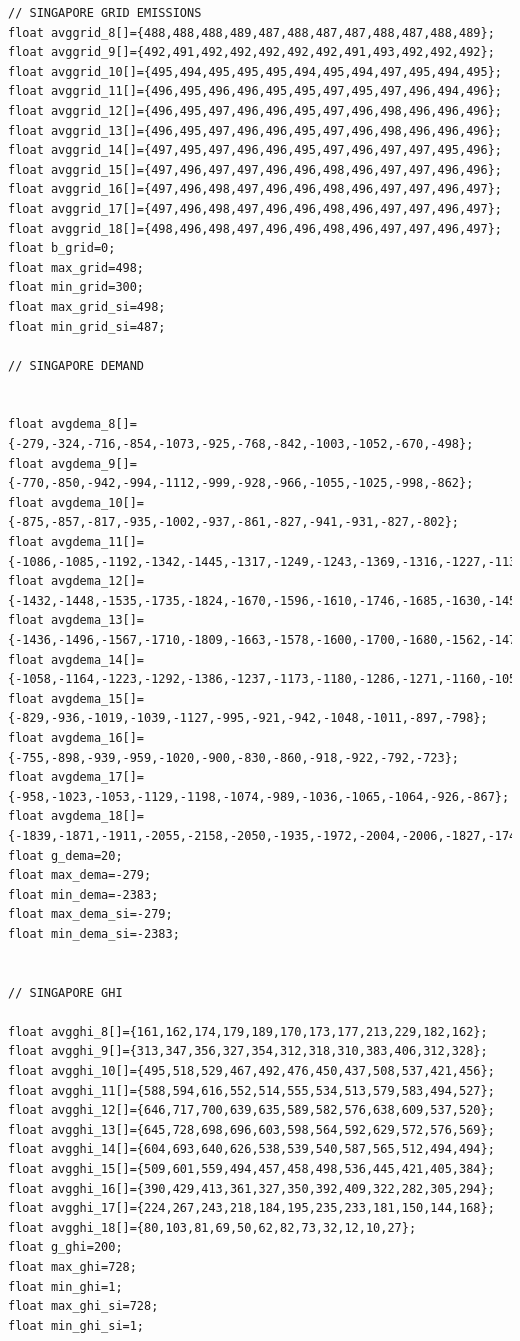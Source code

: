 \documentclass[a4paper,9pt]{article}
\begin{document}
\begin{lstlisting}[basicstyle=\tiny,style=CStyle]
// SINGAPORE GRID EMISSIONS
float avggrid_8[]={488,488,488,489,487,488,487,487,488,487,488,489};
float avggrid_9[]={492,491,492,492,492,492,492,491,493,492,492,492};
float avggrid_10[]={495,494,495,495,495,494,495,494,497,495,494,495};
float avggrid_11[]={496,495,496,496,495,495,497,495,497,496,494,496};
float avggrid_12[]={496,495,497,496,496,495,497,496,498,496,496,496};
float avggrid_13[]={496,495,497,496,496,495,497,496,498,496,496,496};
float avggrid_14[]={497,495,497,496,496,495,497,496,497,497,495,496};
float avggrid_15[]={497,496,497,497,496,496,498,496,497,497,496,496};
float avggrid_16[]={497,496,498,497,496,496,498,496,497,497,496,497};
float avggrid_17[]={497,496,498,497,496,496,498,496,497,497,496,497};
float avggrid_18[]={498,496,498,497,496,496,498,496,497,497,496,497};
float b_grid=0;
float max_grid=498;
float min_grid=300;
float max_grid_si=498;
float min_grid_si=487;

// SINGAPORE DEMAND


float avgdema_8[]={-279,-324,-716,-854,-1073,-925,-768,-842,-1003,-1052,-670,-498};
float avgdema_9[]={-770,-850,-942,-994,-1112,-999,-928,-966,-1055,-1025,-998,-862};
float avgdema_10[]={-875,-857,-817,-935,-1002,-937,-861,-827,-941,-931,-827,-802};
float avgdema_11[]={-1086,-1085,-1192,-1342,-1445,-1317,-1249,-1243,-1369,-1316,-1227,-1131};
float avgdema_12[]={-1432,-1448,-1535,-1735,-1824,-1670,-1596,-1610,-1746,-1685,-1630,-1459};
float avgdema_13[]={-1436,-1496,-1567,-1710,-1809,-1663,-1578,-1600,-1700,-1680,-1562,-1470};
float avgdema_14[]={-1058,-1164,-1223,-1292,-1386,-1237,-1173,-1180,-1286,-1271,-1160,-1052};
float avgdema_15[]={-829,-936,-1019,-1039,-1127,-995,-921,-942,-1048,-1011,-897,-798};
float avgdema_16[]={-755,-898,-939,-959,-1020,-900,-830,-860,-918,-922,-792,-723};
float avgdema_17[]={-958,-1023,-1053,-1129,-1198,-1074,-989,-1036,-1065,-1064,-926,-867};
float avgdema_18[]={-1839,-1871,-1911,-2055,-2158,-2050,-1935,-1972,-2004,-2006,-1827,-1748};
float g_dema=20;
float max_dema=-279;
float min_dema=-2383;
float max_dema_si=-279;
float min_dema_si=-2383;


// SINGAPORE GHI

float avgghi_8[]={161,162,174,179,189,170,173,177,213,229,182,162};
float avgghi_9[]={313,347,356,327,354,312,318,310,383,406,312,328};
float avgghi_10[]={495,518,529,467,492,476,450,437,508,537,421,456};
float avgghi_11[]={588,594,616,552,514,555,534,513,579,583,494,527};
float avgghi_12[]={646,717,700,639,635,589,582,576,638,609,537,520};
float avgghi_13[]={645,728,698,696,603,598,564,592,629,572,576,569};
float avgghi_14[]={604,693,640,626,538,539,540,587,565,512,494,494};
float avgghi_15[]={509,601,559,494,457,458,498,536,445,421,405,384};
float avgghi_16[]={390,429,413,361,327,350,392,409,322,282,305,294};
float avgghi_17[]={224,267,243,218,184,195,235,233,181,150,144,168};
float avgghi_18[]={80,103,81,69,50,62,82,73,32,12,10,27};
float g_ghi=200;
float max_ghi=728;
float min_ghi=1;
float max_ghi_si=728;
float min_ghi_si=1;



\end{lstlisting}
\end{document}
